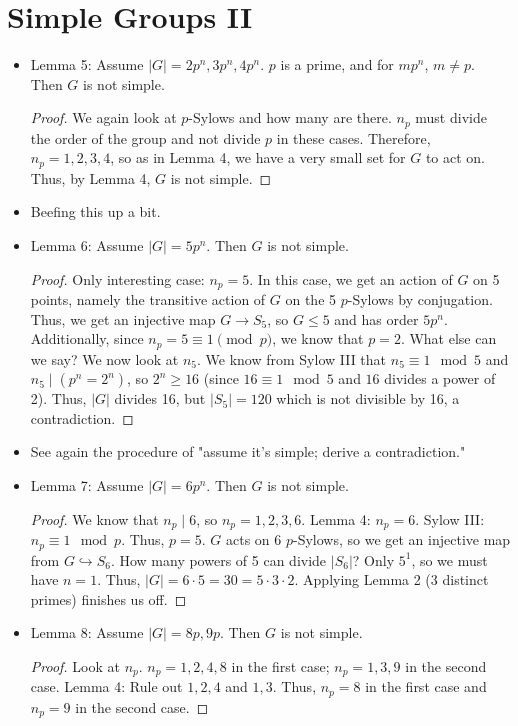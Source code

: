 \documentclass[../notes.tex]{subfiles}
\begin{document}
\section{Simple Groups II}
\begin{itemize}
    \item {}Lemma 5: Assume $|G|=2p^n,3p^n,4p^n$. $p$ is a prime, and for $mp^n$, $m\neq p$. Then $G$ is not simple.
    \begin{proof}
        We again look at $p$-Sylows and how many are there. $n_p$ must divide the order of the group and not divide $p$ in these cases. Therefore, $n_p=1,2,3,4$, so as in Lemma 4, we have a very small set for $G$ to act on. Thus, by Lemma 4, $G$ is not simple.
    \end{proof}
    \item Beefing this up a bit.
    \item Lemma 6: Assume $|G|=5p^n$. Then $G$ is not simple.
    \begin{proof}
        Only interesting case: $n_p=5$. In this case, we get an action of $G$ on 5 points, namely the transitive action of $G$ on the 5 $p$-Sylows by conjugation. Thus, we get an injective map $G\to S_5$, so $G\leq 5$ and has order $5p^n$.
        Additionally, since $n_p=5\equiv 1\pmod p$, we know that $p=2$.
        What else can we say? We now look at $n_5$. We know from Sylow III that $n_5\equiv 1\mod 5$ and $n_5\mid(p^n=2^n)$, so $2^n\geq 16$ (since $16\equiv 1\mod 5$ and $16$ divides a power of 2). Thus, $|G|$ divides 16, but $|S_5|=120$ which is not divisible by 16, a contradiction.
    \end{proof}
    \item See again the procedure of "assume it's simple; derive a contradiction."
    \item Lemma 7: Assume $|G|=6p^n$. Then $G$ is not simple.
    \begin{proof}
        We know that $n_p\mid 6$, so $n_p=1,2,3,6$. Lemma 4: $n_p=6$. Sylow III: $n_p\equiv 1\mod p$. Thus, $p=5$. $G$ acts on 6 $p$-Sylows, so we get an injective map from $G\hookrightarrow S_6$. How many powers of 5 can divide $|S_6|$? Only $5^1$, so we must have $n=1$. Thus, $|G|=6\cdot 5=30=5\cdot 3\cdot 2$. Applying Lemma 2 (3 distinct primes) finishes us off.
    \end{proof}
    \item Lemma 8: Assume $|G|=8p,9p$. Then $G$ is not simple.
    \begin{proof}
        Look at $n_p$. $n_p=1,2,4,8$ in the first case; $n_p=1,3,9$ in the second case. Lemma 4: Rule out $1,2,4$ and $1,3$. Thus, $n_p=8$ in the first case and $n_p=9$ in the second case.\par

\end{proof}
\end{itemize}
\end{document}
